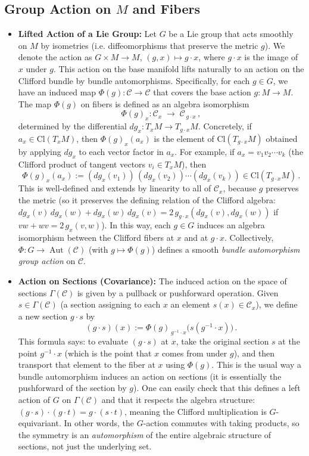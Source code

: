 \documentclass[12pt]{article}
\newcommand{\Cl}{\mathrm{Cl}}
\begin{document}
\subsection{Group Action on \texorpdfstring{$M$}{M} and Fibers}
\begin{itemize}
    \item \textbf{Lifted Action of a Lie Group:} Let $G$ be a Lie group that acts smoothly on $M$ by isometries (i.e. diffeomorphisms that preserve the metric $g$). We denote the action as $G \times M \to M$, $(g, x) \mapsto g\cdot x$, where $g\cdot x$ is the image of $x$ under $g$. This action on the base manifold lifts naturally to an action on the Clifford bundle by bundle automorphisms. Specifically, for each $g \in G$, we have an induced map $\Phi(g): \mathcal{C} \to \mathcal{C}$ that covers the base action $g: M \to M$. The map $\Phi(g)$ on fibers is defined as an algebra isomorphism 
    \[
       \Phi(g)_x : \mathcal{C}_x \;\to\; \mathcal{C}_{\,g\cdot x}\,,
    \] 
    determined by the differential $dg_x: T_x M \to T_{g\cdot x}M$.  Concretely, if $a_x \in \Cl(T_xM)$, then $\Phi(g)_x(a_x)$ is the element of $\Cl(T_{g\cdot x}M)$ obtained by applying $dg_x$ to each vector factor in $a_x$. For example, if $a_x = v_1 v_2 \cdots v_k$ (the Clifford product of tangent vectors $v_i \in T_xM$), then 
    \[
       \Phi(g)_x(a_x) := (dg_x(v_1))\, (dg_x(v_2)) \cdots (dg_x(v_k)) \in \Cl(T_{g\cdot x}M)\,. 
    \] 
    This is well-defined and extends by linearity to all of $\mathcal{C}_x$, because $g$ preserves the metric (so it preserves the defining relation of the Clifford algebra: $dg_x(v)\,dg_x(w)+dg_x(w)\,dg_x(v) = 2\,g_{g\cdot x}(dg_x(v), dg_x(w))$ if $v w + w v = 2\,g_x(v,w)$). In this way, each $g\in G$ induces an algebra isomorphism between the Clifford fibers at $x$ and at $g\cdot x$. Collectively, $\Phi: G \to \operatorname{Aut}(\mathcal{C})$ (with $g \mapsto \Phi(g)$) defines a smooth \emph{bundle automorphism group action} on $\mathcal{C}$.

    \item \textbf{Action on Sections (Covariance):} The induced action on the space of sections $\Gamma(\mathcal{C})$ is given by a pullback or pushforward operation. Given $s \in \Gamma(\mathcal{C})$ (a section assigning to each $x$ an element $s(x) \in \mathcal{C}_x$), we define a new section $g \cdot s$ by 
    \[
        (g\cdot s)(x) := \Phi(g)_{\,g^{-1}\cdot x}\big(s(g^{-1}\cdot x)\big)\,.
    \] 
    This formula says: to evaluate $(g\cdot s)$ at $x$, take the original section $s$ at the point $g^{-1}\cdot x$ (which is the point that $x$ comes from under $g$), and then transport that element to the fiber at $x$ using $\Phi(g)$. This is the usual way a bundle automorphism induces an action on sections (it is essentially the pushforward of the section by $g$). One can easily check that this defines a left action of $G$ on $\Gamma(\mathcal{C})$ and that it respects the algebra structure: $(g\cdot s) \cdot (g \cdot t) = g \cdot (s \cdot t)$, meaning the Clifford multiplication is $G$-equivariant. In other words, the $G$-action commutes with taking products, so the symmetry is an \emph{automorphism} of the entire algebraic structure of sections, not just the underlying set.


\end{itemize}
\end{document}
